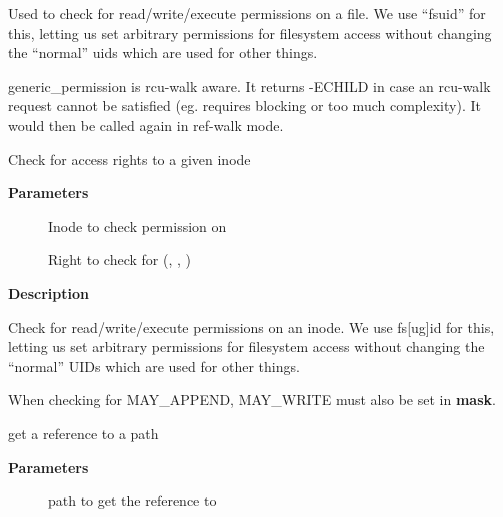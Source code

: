 \documentclass[a4paper,8pt,english]{sphinxmanual}
\begin{document}
Used to check for read/write/execute permissions on a file.
We use ``fsuid'' for this, letting us set arbitrary permissions
for filesystem access without changing the ``normal'' uids which
are used for other things.

generic\_permission is rcu-walk aware. It returns -ECHILD in case an rcu-walk
request cannot be satisfied (eg. requires blocking or too much complexity).
It would then be called again in ref-walk mode.

\begin{fulllineitems}
\label{filesystems/index:c.inode_permission}
Check for access rights to a given inode

\end{fulllineitems}


\textbf{Parameters}
\begin{description}
\item[{}] \leavevmode
Inode to check permission on

\item[{}] \leavevmode
Right to check for (, , )

\end{description}

\textbf{Description}

Check for read/write/execute permissions on an inode.  We use fs{[}ug{]}id for
this, letting us set arbitrary permissions for filesystem access without
changing the ``normal'' UIDs which are used for other things.

When checking for MAY\_APPEND, MAY\_WRITE must also be set in \textbf{mask}.

\begin{fulllineitems}
\label{filesystems/index:c.path_get}
get a reference to a path

\end{fulllineitems}


\textbf{Parameters}
\begin{description}
\item[{}] \leavevmode
path to get the reference to

\end{description}
\end{document}
